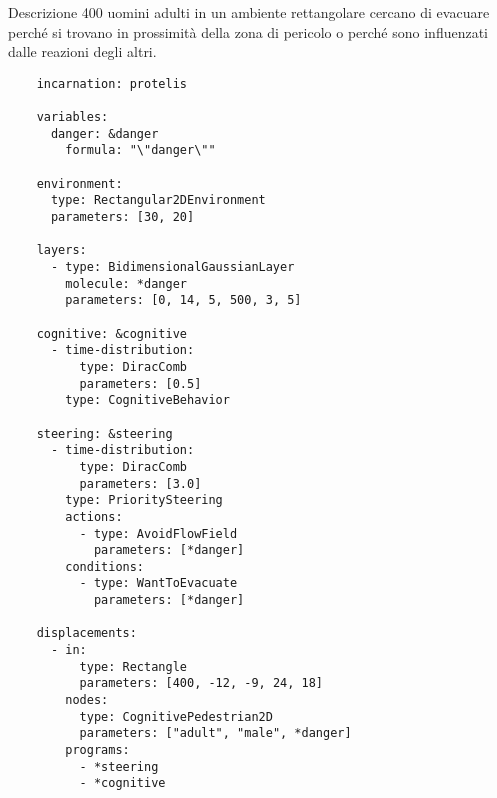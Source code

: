 
\begin{block}{Descrizione}
    \scriptsize
    400 uomini adulti in un ambiente rettangolare cercano di evacuare perché si trovano in prossimità della zona di pericolo o perché sono influenzati dalle reazioni degli altri.
\end{block}

\begin{multicols}{2}
    \begin{verbatim}
    incarnation: protelis
    
    variables:
      danger: &danger
        formula: "\"danger\""
    
    environment:
      type: Rectangular2DEnvironment
      parameters: [30, 20]
    
    layers:
      - type: BidimensionalGaussianLayer
        molecule: *danger
        parameters: [0, 14, 5, 500, 3, 5]
    
    cognitive: &cognitive
      - time-distribution:
          type: DiracComb
          parameters: [0.5]
        type: CognitiveBehavior
    
    steering: &steering
      - time-distribution:
          type: DiracComb
          parameters: [3.0]
        type: PrioritySteering
        actions:
          - type: AvoidFlowField
            parameters: [*danger]
        conditions:
          - type: WantToEvacuate
            parameters: [*danger]
    
    displacements:
      - in:
          type: Rectangle
          parameters: [400, -12, -9, 24, 18]
        nodes:
          type: CognitivePedestrian2D
          parameters: ["adult", "male", *danger]
        programs:
          - *steering
          - *cognitive
    \end{verbatim}
\end{multicols}